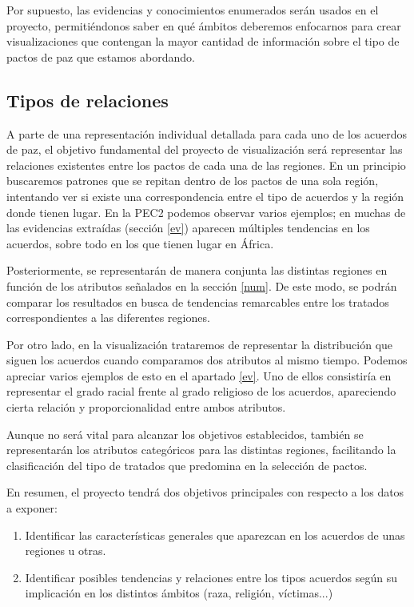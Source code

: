 \documentclass[11pt]{article}
\begin{document}
Por supuesto, las evidencias y conocimientos enumerados serán usados en el proyecto, permitiéndonos saber en qué ámbitos deberemos enfocarnos para crear visualizaciones que contengan la mayor cantidad de información sobre el tipo de pactos de paz que estamos abordando.

\subsection{Tipos de relaciones}

A parte de una representación individual detallada para cada uno de los acuerdos de paz, el objetivo fundamental del proyecto de visualización será representar las relaciones existentes entre los pactos de cada una de las regiones. En un principio buscaremos patrones que se repitan dentro de los pactos de una sola región, intentando ver si existe una correspondencia entre el tipo de acuerdos y la región donde tienen lugar. En la PEC2 podemos observar varios ejemplos; en muchas de las evidencias extraídas (sección \ref{ev}) aparecen múltiples tendencias en los acuerdos, sobre todo en los que tienen lugar en África.

Posteriormente, se representarán de manera conjunta las distintas regiones en función de los atributos señalados en la sección \ref{num}. De este modo, se podrán comparar los resultados en busca de tendencias remarcables entre los tratados correspondientes a las diferentes regiones.

Por otro lado, en la visualización trataremos de representar la distribución que siguen los acuerdos cuando comparamos dos atributos al mismo tiempo. Podemos apreciar varios ejemplos de esto en el apartado \ref{ev}. Uno de ellos consistiría en representar el grado racial frente al grado religioso de los acuerdos, apareciendo cierta relación y proporcionalidad entre ambos atributos.

Aunque no será vital para alcanzar los objetivos establecidos, también se representarán los atributos categóricos para las distintas regiones, facilitando la clasificación del tipo de tratados que predomina en la selección de pactos.

En resumen, el proyecto tendrá dos objetivos principales con respecto a los datos a exponer:
\begin{enumerate}
    \item Identificar las características generales que aparezcan en los acuerdos de unas regiones u otras.
    \item Identificar posibles tendencias y relaciones entre los tipos acuerdos según su implicación en los distintos ámbitos (raza, religión, víctimas...)
\end{enumerate}
\end{document}
